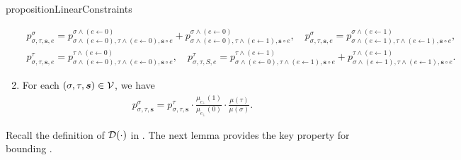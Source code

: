 \documentclass[11pt]{article}
\newcommand{\seqS}{\boldsymbol{s}}
\newcommand{\hktodo}[1]{{\color{blue}{#1}}}
\begin{document}
\begin{restatable}{proposition}{LinearConstraints}
\begin{enumerate}[(1)]
\begin{align}
                p^{\sigma}_{\sigma,\tau, \seqS,e}=p^{\sigma \land (e\gets 0)}_{\sigma\land (e\gets 0),\tau\land (e\gets 0), \seqS\circ e}+p^{\sigma\land (e\gets 0)}_{\sigma\land (e\gets 0),\tau\land (e\gets 1), \seqS \circ e}, \quad  p^{\sigma}_{\sigma,\tau, \seqS,e}=p^{\sigma\land (e\gets 1)}_{\sigma\land (e\gets 1),\tau\land (e\gets 1), \seqS\circ e},
            \end{align}
            \begin{align}\label{eqn-inner-child-sum4}
                p^{\tau}_{\sigma,\tau, \seqS,e}=p^{\tau\land (e\gets 0)}_{\sigma\land (e\gets 0),\tau\land (e\gets 0), \seqS\circ e}, \quad  p^{\tau}_{\sigma,\tau,S,e}=p^{\tau\land (e\gets 1)}_{\sigma\land (e\gets 0),\tau\land (e\gets 1), \seqS \circ e} + p^{\tau \land (e\gets 1)}_{\sigma\land (e\gets 1),\tau\land (e\gets 1), \seqS\circ e}.
            \end{align}
            \item For each $(\sigma, \tau, \seqS) \in \+V$, we have
            \begin{align}\label{eqn-ratio}
            	{p^{\sigma}_{\sigma,\tau, \seqS}} = p^{\tau}_{\sigma,\tau, \seqS} \cdot \frac{\mu_{e_{\bot}}(1)}{\mu_{e_{\bot}}(0)}\cdot \frac{ \mu(\tau)}{ \mu(\sigma)}.
            \end{align}
        \end{enumerate}
    \end{restatable}
    
    Recall the definition of $\mathcal{D}(\cdot)$ in . The next lemma provides the key property for bounding \hktodo{the coupling error}.
\end{document}
